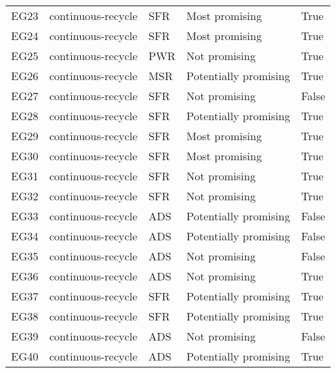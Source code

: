 \begin{tabular}{lllll}
EG23 & continuous-recycle & SFR & Most promising & True \\
EG24 & continuous-recycle & SFR & Most promising & True \\
\rowcolor{orange}
EG25 & continuous-recycle & PWR & Not promising & True \\
EG26 & continuous-recycle & MSR & Potentially promising & True \\
EG27 & continuous-recycle & SFR & Not promising & False \\
EG28 & continuous-recycle & SFR & Potentially promising & True \\
EG29 & continuous-recycle & SFR & Most promising & True \\
EG30 & continuous-recycle & SFR & Most promising & True \\
\rowcolor{orange}
EG31 & continuous-recycle & SFR & Not promising & True \\
\rowcolor{orange}
EG32 & continuous-recycle & SFR & Not promising & True \\
\rowcolor{yellow}
EG33 & continuous-recycle & ADS & Potentially promising & False \\
\rowcolor{yellow}
EG34 & continuous-recycle & ADS & Potentially promising & False \\
EG35 & continuous-recycle & ADS & Not promising & False \\
\rowcolor{orange}
EG36 & continuous-recycle & ADS & Not promising & True \\
EG37 & continuous-recycle & SFR & Potentially promising & True \\
EG38 & continuous-recycle & SFR & Potentially promising & True \\
EG39 & continuous-recycle & ADS & Not promising & False \\
EG40 & continuous-recycle & ADS & Potentially promising & True \\
\bottomrule
\end{tabular}
